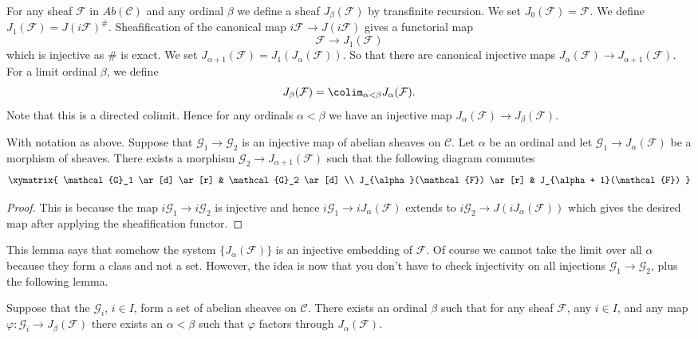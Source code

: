 \medskip\noindent
For any sheaf $\mathcal{F}$ in $\textit{Ab}(\mathcal{C})$ and
any ordinal $\beta$ we define a sheaf
$J_\beta(\mathcal{F})$ by transfinite recursion.
We set $J_0(\mathcal{F}) = \mathcal{F}$.
We define $J_1(\mathcal{F}) = J(i\mathcal{F})^\#$.
Sheafification of the canonical map $i\mathcal{F} \to J(i\mathcal{F})$
gives a functorial map
$$
\mathcal{F} \longrightarrow J_1(\mathcal{F})
$$
which is injective as $\#$ is exact. We set
$J_{\alpha + 1}(\mathcal{F}) = J_1(J_\alpha(\mathcal{F}))$.
So that there are canonical injective maps
$J_\alpha(\mathcal{F}) \to J_{\alpha + 1}(\mathcal{F})$.
For a limit ordinal $\beta$, we define
$$
J_\beta(\mathcal{F}) = \colim_{\alpha < \beta} J_\alpha(\mathcal{F}).
$$
Note that this is a directed colimit. Hence for any ordinals $\alpha < \beta$
we have an injective map $J_\alpha(\mathcal{F}) \to J_\beta(\mathcal{F})$.

\begin{lemma}
\label{lemma-map-into-next-one}
With notation as above.
Suppose that $\mathcal{G}_1 \to \mathcal{G}_2$ is an injective
map of abelian sheaves on $\mathcal{C}$. Let $\alpha$ be an ordinal
and let $\mathcal{G}_1 \to J_\alpha(\mathcal{F})$ be a morphism
of sheaves. There exists a morphism $\mathcal{G}_2 \to
J_{\alpha + 1}(\mathcal{F})$ such that the following diagram commutes
$$
\xymatrix{
\mathcal{G}_1 \ar[d] \ar[r] & \mathcal{G}_2 \ar[d] \\
J_{\alpha}(\mathcal{F}) \ar[r] & J_{\alpha + 1}(\mathcal{F}) }
$$
\end{lemma}

\begin{proof}
This is because the map $i\mathcal{G}_1 \to i\mathcal{G}_2$ is injective
and hence $i\mathcal{G}_1 \to iJ_\alpha(\mathcal{F})$ extends to
$i\mathcal{G}_2 \to J(iJ_\alpha(\mathcal{F}))$ which gives the
desired map after applying the sheafification functor.
\end{proof}

\noindent
This lemma says that somehow the system $\{J_{\alpha}(\mathcal{F})\}$
is an injective embedding of $\mathcal{F}$. Of course
we cannot take the limit over all $\alpha$ because they form a class
and not a set. However, the idea is now that you don't have to check
injectivity on all injections $\mathcal{G}_1 \to \mathcal{G}_2$, plus
the following lemma.

\begin{lemma}
\label{lemma-map-into-smaller}
Suppose that the $\mathcal{G}_i$, $i\in I$, form a set of abelian sheaves
on $\mathcal{C}$. There exists an ordinal $\beta$ such that
for any sheaf $\mathcal{F}$, any $i\in I$, and any map
$\varphi : \mathcal{G}_i \to J_\beta(\mathcal{F})$ there exists an
$\alpha < \beta$ such that $ \varphi $ factors through
$J_\alpha(\mathcal{F})$.
\end{lemma}

